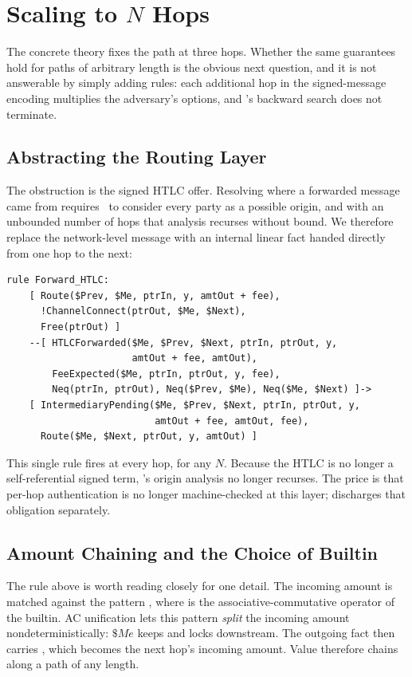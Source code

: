 \section{Scaling to \texorpdfstring{$N$}{N} Hops}
\label{sec:nhop}

The concrete theory fixes the path at three hops. Whether the same guarantees
hold for paths of arbitrary length is the obvious next question, and it is not
answerable by simply adding rules: each additional hop in the signed-message
encoding multiplies the adversary's options, and \mtamarin's backward search
does not terminate.

\subsection{Abstracting the Routing Layer}

The obstruction is the signed HTLC offer. Resolving where a forwarded message
came from requires \mtamarin\ to consider every party as a possible origin, and
with an unbounded number of hops that analysis recurses without bound. We
therefore replace the network-level message with an internal linear fact handed
directly from one hop to the next:

\begin{lstlisting}
rule Forward_HTLC:
    [ Route($Prev, $Me, ptrIn, y, amtOut + fee),
      !ChannelConnect(ptrOut, $Me, $Next),
      Free(ptrOut) ]
    --[ HTLCForwarded($Me, $Prev, $Next, ptrIn, ptrOut, y,
                      amtOut + fee, amtOut),
        FeeExpected($Me, ptrIn, ptrOut, y, fee),
        Neq(ptrIn, ptrOut), Neq($Prev, $Me), Neq($Me, $Next) ]->
    [ IntermediaryPending($Me, $Prev, $Next, ptrIn, ptrOut, y,
                          amtOut + fee, amtOut, fee),
      Route($Me, $Next, ptrOut, y, amtOut) ]
\end{lstlisting}

This single rule fires at every hop, for any $N$. Because the HTLC is no longer
a self-referential signed term, \mtamarin's origin analysis no longer recurses.
The price is that per-hop authentication is no longer machine-checked at this
layer;  discharges that obligation separately.

\subsection{Amount Chaining and the Choice of Builtin}

The rule above is worth reading closely for one detail. The incoming amount is
matched against the pattern , where \code{+} is the
associative-commutative operator of the  builtin. AC unification
lets this pattern \emph{split} the incoming amount nondeterministically: $\$Me$
keeps  and locks  downstream. The outgoing 
fact then carries , which becomes the next hop's incoming amount.
Value therefore chains along a path of any length.

